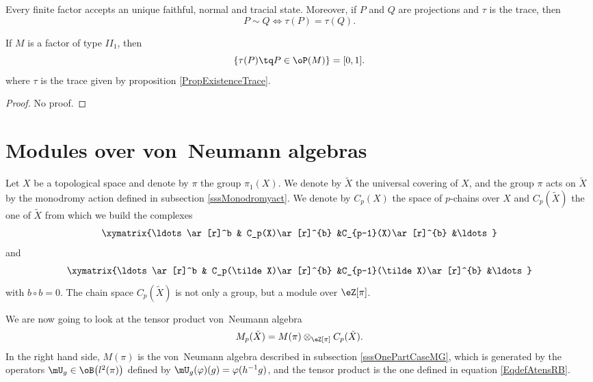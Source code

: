 \begin{proposition}		\label{PropExistenceTrace}
Every finite factor accepts an unique faithful, normal and tracial state. Moreover, if $P$ and $Q$ are projections and $\tau$ is the trace, then
\begin{equation}
	P\sim Q\Leftrightarrow \tau(P)=\tau(Q).
\end{equation}
\end{proposition}

\begin{proposition}	\label{PropFactIIunttedim}						
If $M$ is a factor of type $II_1$, then
\begin{equation}
	\{ \tau(P)\tq P\in \oP(M) \}=[0,1].	
\end{equation}
where $\tau$ is the trace given by proposition \ref{PropExistenceTrace}.
\end{proposition}

\begin{proof}
No proof.
\end{proof}
					\section{Modules over von~Neumann algebras}
\label{SecOverModVNalgDim}

Let $X$ be a topological space and denote by $\pi$ the group $\pi_1(X)$. We denote by $\tilde X$ the universal covering of $X$, and the group $\pi$ acts on $\tilde X$ by the monodromy action defined in subsection \ref{sssMonodromyact}. We denote by $C_p(X)$ the space of $p$-chains over $X$ and $C_p(\tilde X)$ the one of $\tilde X$ from which we build the complexes
\[ 
  \xymatrix{%
   \ldots \ar[r]^b	&	C_p(X)\ar[r]^{b}	&C_{p-1}(X)\ar[r]^{b}	&\ldots	
}
\]
and
\[ 
  \xymatrix{%
   \ldots \ar[r]^b	&	C_p(\tilde X)\ar[r]^{b}	&C_{p-1}(\tilde X)\ar[r]^{b}	&\ldots	
}
\]
with $b\circ b=0$. The chain space $C_p(\tilde X)$ is not only a group, but a module over $\eZ[\pi]$.

We are now going to look at the tensor product von~Neumann algebra
\begin{equation}
	M_p(\tilde X)=M(\pi)\otimes_{\eZ[\pi]}C_p(\tilde X).
\end{equation}
In the right hand side, $M(\pi)$ is the von~Neumann algebra described in subsection \ref{sssOnePartCaseMG}, which is generated by the operators $\mU_g\in\oB\big( l^2(\pi) \big)$ defined by $\mU_g(\varphi)(g)=\varphi(h^{-1}g)$, and the tensor product is the one defined in equation \eqref{EqdefAtensRB}.

